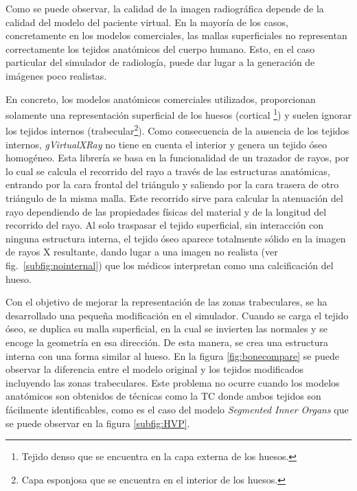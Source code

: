 Como se puede observar, la calidad de la imagen radiográfica depende de la calidad del modelo del paciente virtual. %
En la mayoría de los casos, concretamente en los modelos comerciales, las mallas superficiales no representan correctamente los tejidos anatómicos del cuerpo humano. Esto, en el caso particular del simulador de radiología,  puede dar lugar a la generación de imágenes poco realistas. 

En concreto, los modelos anatómicos comerciales utilizados, proporcionan solamente una representación superficial de los huesos (cortical \footnote{Tejido denso que se encuentra en la capa externa de los huesos.}) y suelen ignorar los tejidos internos (trabecular\footnote{Capa esponjosa que se encuentra en el interior de los huesos.}). Como consecuencia de la ausencia de los tejidos internos, \emph{gVirtualXRay} no tiene en cuenta el interior y genera un tejido óseo homogéneo. 
Esta librería se basa en la funcionalidad de un trazador de rayos, por lo cual se calcula el recorrido del rayo a través de las estructuras anatómicas, entrando por la cara frontal del triángulo y saliendo por la cara trasera de otro triángulo de la misma malla. Este recorrido sirve para calcular la atenuación del rayo dependiendo de las propiedades físicas del material y de la longitud del recorrido del rayo. Al solo traspasar el tejido superficial, sin interacción con ninguna estructura interna, el tejido óseo aparece totalmente sólido en la imagen de rayos X resultante, dando lugar a una imagen no realista (ver fig.~\ref{subfig:nointernal}) que los médicos interpretan como una calcificación del hueso.

Con el objetivo de mejorar la representación de las zonas trabeculares, se ha desarrollado una pequeña modificación en el simulador. Cuando se carga el tejido óseo, se duplica su malla superficial, en la cual se invierten las normales y se encoge la geometría en esa dirección. De esta manera, se crea una estructura interna con una forma similar al hueso. En la figura \ref{fig:bonecompare} se puede observar la diferencia entre el modelo original y los tejidos modificados incluyendo las zonas trabeculares. Este problema no ocurre cuando los modelos anatómicos son obtenidos de técnicas como la \ac{TC} donde ambos tejidos son fácilmente identificables, como es el caso del modelo \emph{Segmented Inner Organs}\cite{VoxelMan} que se puede observar en la figura \ref{subfig:HVP}.




